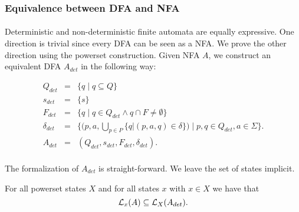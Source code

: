 
\subsubsection{Equivalence between DFA and NFA}
\paragraph{} 
Deterministic and non-deterministic finite automata are equally expressive. 
One direction is trivial since every DFA can be seen as a NFA. 
We prove the other direction using the powerset construction. 
Given NFA $A$, we construct an equivalent DFA $A_{det}$ in the following way:

\begin{eqnarray*}
    Q_{det} & = & \{q \; | \; q \subseteq Q\} \\
    {s}_{det} & = & \{ s \} \\
    F_{det} & = & \{ q \; | \; q \in Q_{det} \wedge q \cap F \neq \emptyset \} \\
    \delta_{det} & = & \{ (p,a,\bigcup \limits _{p \in P} \{ q | (p,a,q) \in \delta \}) \; | \; p, q \in Q_{det}, a \in \Sigma \}.     \\
    A_{det} &=&  (Q_{det}, s_{det}, F_{det}, \delta_{det}).
\end{eqnarray*}

\paragraph{}
The formalization of $A_{det}$ is straight-forward. 
We leave the set of states implicit.


\begin{lemma}
    \label{nfa_to_dfa_complete}
    For all powerset states $X$ and for all states $x$ with $x \in X$ we have that
    \begin{equation*}
        \mathcal{L}_{x}(A) \subseteq \mathcal{L}_{X}(A_{det}).
    \end{equation*}
\end{lemma}


